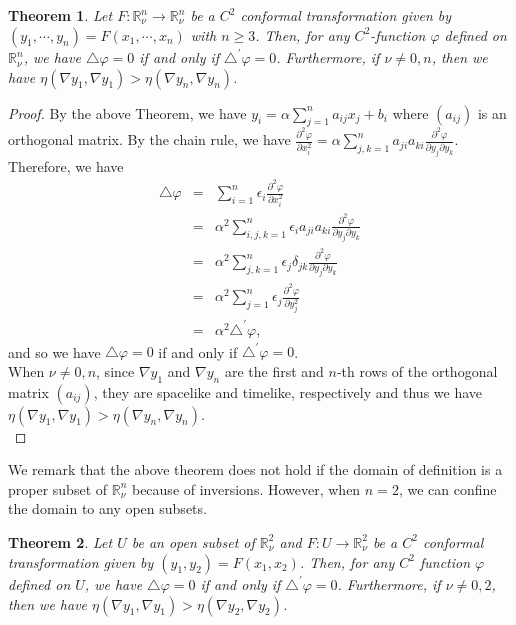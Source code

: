 \documentclass[a4paper,10pt]{amsart}
\theoremstyle{plain}
\newtheorem{thm}{Theorem}[section]
\newtheorem*{main theorem}{Theorem}
\theoremstyle{definition}
\begin{document}
\begin{thm}
Let $F : \mathbb{R}^n_\nu \rightarrow \mathbb{R}^n_\nu$ be a $C^2$
conformal transformation given by $(y_1, \cdots, y_n) = F(x_1,
\cdots, x_n)$ with $n \geq 3$. Then, for any $C^2$-function
$\varphi$ defined on $\mathbb{R}^n_\nu$, we have $\triangle
\varphi = 0$ if and only if $\triangle^\prime \varphi = 0$.
Furthermore, if $\nu \neq 0, n$, then we have $\eta(\nabla y_1,
\nabla y_1) > \eta(\nabla y_n, \nabla y_n)$.
\end{thm}
\begin{proof}

 By the above Theorem, we have $y_i =
\alpha \sum\limits_{j=1}^n a_{ij}x_j +b_i$ where $(a_{ij})$ is an
orthogonal matrix. By the chain rule, we have $\frac{\partial^2
\varphi}{\partial x_i^2} = \alpha \sum\limits_{j,k=1}^n
a_{ji}a_{ki} \frac{\partial^2 \varphi}{\partial y_j \partial
y_k}$. Therefore, we have
\begin{eqnarray*}
\triangle \varphi & = & \sum\limits_{i=1}^n \epsilon_i
\frac{\partial^2 \varphi}{\partial x_i^2}\\
& = & \alpha^2 \sum\limits_{i,j,k=1}^n \epsilon_i a_{ji}a_{ki}
\frac{\partial^2 \varphi}{\partial y_j \partial y_k}\\
& = & \alpha^2 \sum\limits_{j,k=1}^n \epsilon_j \delta_{jk}
\frac{\partial^2 \varphi}{\partial y_j \partial y_k}\\
& = & \alpha^2 \sum\limits_{j=1}^n \epsilon_j \frac{\partial^2
\varphi}{\partial y_j^2}\\
& = & \alpha^2 \triangle^\prime \varphi,
\end{eqnarray*}
and so we have $\triangle \varphi = 0$ if and only if
$\triangle^\prime \varphi = 0$.\\
When $\nu \neq 0, n$, since $\nabla y_1$ and $\nabla y_n$ are the
first and $n$-th rows of the orthogonal matrix $(a_{ij})$, they
are spacelike and timelike, respectively and thus we have
$\eta(\nabla
y_1, \nabla y_1) > \eta(\nabla y_n, \nabla y_n)$.\\




\end{proof}

We remark that the above theorem does not hold if the domain of
definition is a proper subset of $\mathbb{R}^n_\nu$ because of
inversions. However, when $n=2$, we can confine the domain to any
 open subsets.



\begin{thm} \label{main2}
Let $U$ be an open subset of $\mathbb{R}^2_\nu$ and $F : U
\rightarrow  \mathbb{R}^2_\nu$ be a $C^2$ conformal transformation
given by $(y_1, y_2) = F(x_1, x_2)$. Then, for any $C^2$ function
$\varphi$ defined on $U$, we have $\triangle \varphi = 0$ if and
only if $\triangle^\prime \varphi = 0$. Furthermore, if $\nu \neq
0, 2$, then we have $\eta(\nabla y_1, \nabla y_1) > \eta(\nabla
y_2, \nabla y_2)$.

\end{thm}
\end{document}
